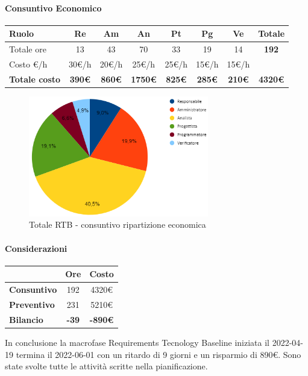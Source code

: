 \paragraph{Consuntivo Economico}
\begin{center}
	\renewcommand{\arraystretch}{1.8}
	\begin{tabular}{ |m{6em}|c|c|c|c|c|c|c| }
	\hline
	\textbf{Ruolo} & \textbf{Re} & \textbf{Am} &  \textbf{An} &  \textbf{Pt} &  \textbf{Pg} &  \textbf{Ve} &  \textbf{Totale}\\
    \hline
    Totale ore & 13 & 43 & 70 & 33 & 19 & 14 & \textbf{192}\\
    \hline
    Costo \euro/h & 30\euro/h & 20\euro/h & 25\euro/h & 25\euro/h & 15\euro/h & 15\euro/h & \\
    \hline
    \textbf{Totale costo} & \textbf{390\euro} & \textbf{860\euro} &  \textbf{1750\euro} &  \textbf{825\euro} &  \textbf{285\euro} &  \textbf{210\euro} &  \textbf{4320\euro}\\
    \hline
	\end{tabular}

    \begin{figure}[H]
        \centering\includegraphics[width=0.7\textwidth, height=0.7\textheight, keepaspectratio]{images/consuntivo/RTB-costo.png}
        \caption{Totale RTB - consuntivo ripartizione economica}
    \end{figure}
\end{center}

\paragraph{Considerazioni} \hfill \break
\begin{center}
	\renewcommand{\arraystretch}{1.8}
	\begin{tabular}{ | l |c|c| }
    \hline
    & \textbf{Ore} & \textbf{Costo} \\
	\hline
    \textbf{Consuntivo} & 192 & 4320\euro \\
    \hline
    \textbf{Preventivo} & 231 & 5210\euro \\
    \hline
    \textbf{Bilancio} & \textbf{-39} & \textbf{-890\euro} \\
    \hline
    \end{tabular}
\end{center}
In conclusione la macrofase Requirements Tecnology Baseline iniziata il 2022-04-19 termina il 2022-06-01 con un ritardo di 9 giorni e un risparmio di 890\euro.
Sono state svolte tutte le attività scritte nella pianificazione.

